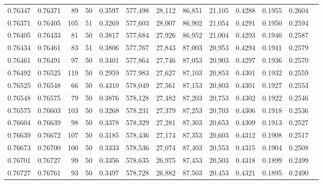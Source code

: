 \begin{tabular}{rrrrrrrrrrrrr}
0.76347 & 0.76371 &    89 &  50 &                                     0.3597 & 577,498 &  28,112 &  86,851 &  21,105 & 0.4288 & 0.1955 & 0.2604 \\
0.76371 & 0.76405 &   105 &  51 &                                     0.3269 & 577,603 &  28,007 &  86,902 &  21,054 & 0.4291 & 0.1950 & 0.2594 \\
0.76405 & 0.76433 &    81 &  50 &                                     0.3817 & 577,684 &  27,926 &  86,952 &  21,004 & 0.4293 & 0.1946 & 0.2587 \\
0.76434 & 0.76461 &    83 &  51 &                                     0.3806 & 577,767 &  27,843 &  87,003 &  20,953 & 0.4294 & 0.1941 & 0.2579 \\
0.76461 & 0.76491 &    97 &  50 &                                     0.3401 & 577,864 &  27,746 &  87,053 &  20,903 & 0.4297 & 0.1936 & 0.2570 \\
0.76492 & 0.76525 &   119 &  50 &                                     0.2959 & 577,983 &  27,627 &  87,103 &  20,853 & 0.4301 & 0.1932 & 0.2559 \\
0.76525 & 0.76548 &    66 &  50 &                                     0.4310 & 578,049 &  27,561 &  87,153 &  20,803 & 0.4301 & 0.1927 & 0.2553 \\
0.76548 & 0.76575 &    79 &  50 &                                     0.3876 & 578,128 &  27,482 &  87,203 &  20,753 & 0.4302 & 0.1922 & 0.2546 \\
0.76575 & 0.76603 &   103 &  50 &                                     0.3268 & 578,231 &  27,379 &  87,253 &  20,703 & 0.4306 & 0.1918 & 0.2536 \\
0.76604 & 0.76639 &    98 &  50 &                                     0.3378 & 578,329 &  27,281 &  87,303 &  20,653 & 0.4309 & 0.1913 & 0.2527 \\
0.76639 & 0.76672 &   107 &  50 &                                     0.3185 & 578,436 &  27,174 &  87,353 &  20,603 & 0.4312 & 0.1908 & 0.2517 \\
0.76673 & 0.76700 &   100 &  50 &                                     0.3333 & 578,536 &  27,074 &  87,403 &  20,553 & 0.4315 & 0.1904 & 0.2508 \\
0.76701 & 0.76727 &    99 &  50 &                                     0.3356 & 578,635 &  26,975 &  87,453 &  20,503 & 0.4318 & 0.1899 & 0.2499 \\
0.76727 & 0.76761 &    93 &  50 &                                     0.3497 & 578,728 &  26,882 &  87,503 &  20,453 & 0.4321 & 0.1895 & 0.2490 \\

\end{tabular}
